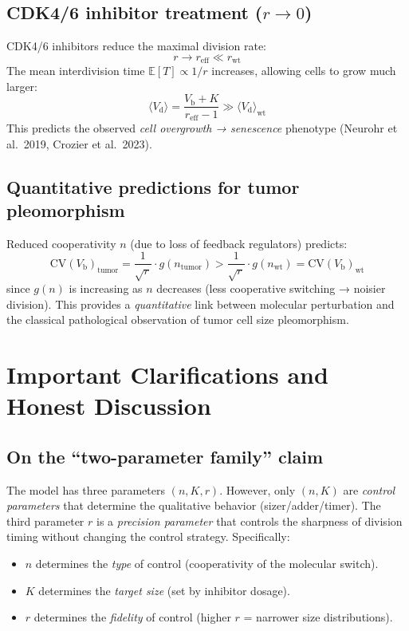 \documentclass[11pt]{article}
\newcommand{\Vb}{V_{\mathrm{b}}}
\newcommand{\Vd}{V_{\mathrm{d}}}
\newcommand{\CV}{\mathrm{CV}}
\newcommand{\E}{\mathbb{E}}
\begin{document}
\subsection{CDK4/6 inhibitor treatment ($r \to 0$)}

CDK4/6 inhibitors reduce the maximal division rate:
\begin{equation}
  r \to r_{\mathrm{eff}} \ll r_{\mathrm{wt}}
\end{equation}
The mean interdivision time $\E[T] \propto 1/r$ increases, allowing cells to grow much larger:
\begin{equation}
  \langle\Vd\rangle = \frac{\Vb + K}{r_{\mathrm{eff}} - 1} \gg \langle\Vd\rangle_{\mathrm{wt}}
\end{equation}
This predicts the observed \emph{cell overgrowth → senescence} phenotype (Neurohr et al.\ 2019, Crozier et al.\ 2023).

\subsection{Quantitative predictions for tumor pleomorphism}

Reduced cooperativity $n$ (due to loss of feedback regulators) predicts:
\begin{equation}
  \CV(\Vb)_{\mathrm{tumor}} = \frac{1}{\sqrt{r}}\cdot g(n_{\mathrm{tumor}}) > \frac{1}{\sqrt{r}}\cdot g(n_{\mathrm{wt}}) = \CV(\Vb)_{\mathrm{wt}}
\end{equation}
since $g(n)$ is increasing as $n$ decreases (less cooperative switching → noisier division). This provides a \emph{quantitative} link between molecular perturbation and the classical pathological observation of tumor cell size pleomorphism.

\section{Important Clarifications and Honest Discussion}

\subsection{On the ``two-parameter family'' claim}

The model has three parameters $(n, K, r)$. However, only $(n, K)$ are \emph{control parameters} that determine the qualitative behavior (sizer/adder/timer). The third parameter $r$ is a \emph{precision parameter} that controls the sharpness of division timing without changing the control strategy. Specifically:
\begin{itemize}
  \item $n$ determines the \emph{type} of control (cooperativity of the molecular switch).
  \item $K$ determines the \emph{target size} (set by inhibitor dosage).
  \item $r$ determines the \emph{fidelity} of control (higher $r$ = narrower size distributions).
\end{itemize}
\end{document}
